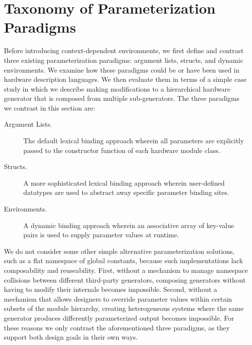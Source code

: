\section{Taxonomy of Parameterization Paradigms}
\label{sec:tax}

Before introducing context-dependent environments, we first define and contrast three existing parameterization paradigms: argument lists, structs, and dynamic environments.
We examine how these paradigms could be or have been used in hardware description languages.
We then  evaluate them in terms of a simple case study
in which we describe making modifications to a hierarchical hardware generator that is composed from multiple sub-generators.
The three paradigms we contrast in this section are:

\begin{description}
\item[Argument Lists.] The default lexical binding approach wherein all parameters are explicitly passed to the constructor function of each hardware module class.
\item[Structs.] A more sophisticated lexical binding approach wherein user-defined datatypes are used to abstract away specific parameter binding sites.
\item[Environments.] A dynamic binding approach wherein an associative array of key-value pairs is used to supply parameter values at runtime.
\end{description}

We do not consider some other simple alternative parameterization solutions, such as a flat namespace of global constants, because such implementations lack composability and reuseability.
First, without a mechanism to manage namespace collisions between different third-party generators, composing generators without having to modify their internals becomes impossible.
Second, without a mechanism that allows designers to override parameter values within certain subsets of the module hierarchy, creating heterogeneous systems where the same generator
produces differently parameterized output becomes impossible.
For these reasons we only contrast the aforementioned three paradigms, as they support both design goals in their own ways.


